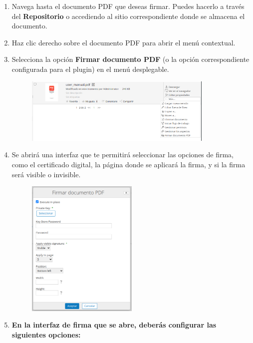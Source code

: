 \documentclass{template/ol-softwaremanual}
\begin{document}
\begin{enumerate}
	\item Navega hasta el documento PDF que deseas firmar. Puedes hacerlo a través del \textbf{Repositorio} o accediendo al sitio correspondiente donde se almacena el documento.
	\item Haz clic derecho sobre el documento PDF para abrir el menú contextual.
	\item Selecciona la opción \textbf{Firmar documento PDF} (o la opción correspondiente configurada para el plugin) en el menú desplegable.
	\begin{figure}[h]
		\centering
		\includegraphics[width=0.85\textwidth]{images/sign-pdf}
		\label{fig:etiqueta_imagen}
	\end{figure}
	\item Se abrirá una interfaz que te permitirá seleccionar las opciones de firma, como el certificado digital, la página donde se aplicará la firma, y si la firma será visible o invisible.
	\begin{figure}[h]
		\centering
		\includegraphics[width=0.5\textwidth]{images/sign-pdf2}
		\label{fig:etiqueta_imagen}
	\end{figure}
	\item \textbf{En la interfaz de firma que se abre, deberás configurar las siguientes opciones:}
	\begin{itemize}

\end{itemize}
\end{enumerate}
\end{document}
